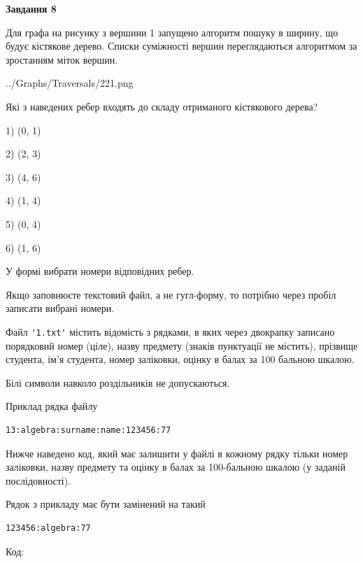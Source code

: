 \documentclass[12pt, ukrainian]{article}
\def\code#1{\Verb!#1!}
\begin{document}
{\begin {large}
{\begin {center}\textbf{Завдання 8}\end {center}}\par
Для графа на рисунку з вершини 1 запущено алгоритм пошуку в ширину, що будує кістякове дерево. Списки суміжності вершин переглядаються алгоритмом за зростанням міток вершин.\par
\begin{center}
	{../Graphs/Traversals/221.png}
\end{center}
\par Які з наведених ребер входять до складу отриманого кістякового дерева?\par
1) (0, 1)\par
2) (2, 3)\par
3) (4, 6)\par
4) (1, 4)\par
5) (0, 4)\par
6) (1, 6)\par
{\vskip 15pt} У формі вибрати номери відповідних ребер.


Якщо заповнюєте текстовий файл, а не гугл-форму, то потрібно через пробіл записа\-ти вибрані номери.\par
\newpage


Файл \code{'1.txt'} містить відомість з рядками, в яких через двокрапку записа\-но поряд\-ковий номер (ціле), назву предмету (знаків пунктуації не містить), прізвище студента, ім'я студента, номер заліковки, оцінку в балах за 100 бальною шкалою.

Білі символи навколо роздільників не допускаються.

Приклад рядка файлу



\begin{verbatim}
13:algebra:surname:name:123456:77
\end{verbatim}


Нижче наведено код, який має залишити у файлі в кожному рядку тільки номер заліковки, назву предмету та оцінку в балах за 100-бальною шкалою (у заданій послі\-дов\-ності).

Рядок з прикладу має бути замінений на такий



\begin{verbatim}
123456:algebra:77
\end{verbatim}




Код:




\end{large}}
\end{document}
